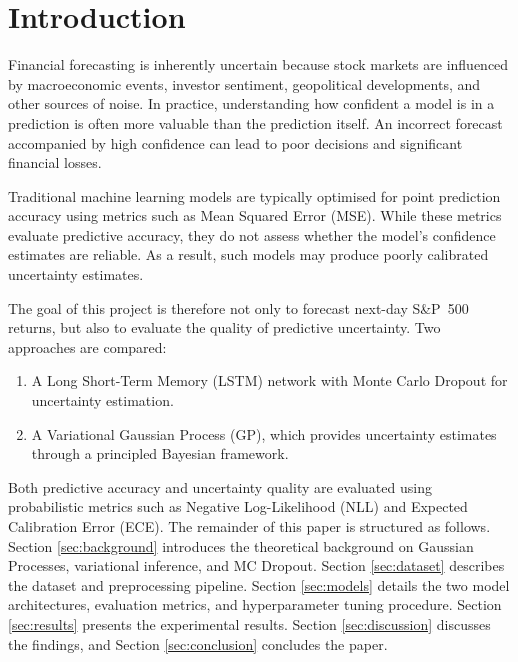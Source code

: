 \section{Introduction}

Financial forecasting is inherently uncertain because stock markets are influenced by macroeconomic events, investor sentiment, geopolitical developments, and other sources of noise. In practice, understanding how confident a model is in a prediction is often more valuable than the prediction itself. An incorrect forecast accompanied by high confidence can lead to poor decisions and significant financial losses.

Traditional machine learning models are typically optimised for point prediction accuracy using metrics such as Mean Squared Error (MSE). While these metrics evaluate predictive accuracy, they do not assess whether the model's confidence estimates are reliable. As a result, such models may produce poorly calibrated uncertainty estimates.

The goal of this project is therefore not only to forecast next-day S\&P~500 returns, but also to evaluate the quality of predictive uncertainty. Two approaches are compared:

\begin{enumerate}
    \item A Long Short-Term Memory (LSTM) network with Monte Carlo Dropout for uncertainty estimation.
    \item A Variational Gaussian Process (GP), which provides uncertainty estimates through a principled Bayesian framework.
\end{enumerate}

Both predictive accuracy and uncertainty quality are evaluated using probabilistic metrics such as Negative Log-Likelihood (NLL) and Expected Calibration Error (ECE). The remainder of this paper is structured as follows. Section \ref{sec:background} introduces the theoretical background on Gaussian Processes, variational inference, and MC Dropout. Section \ref{sec:dataset} describes the dataset and preprocessing pipeline. Section \ref{sec:models} details the two model architectures, evaluation metrics, and hyperparameter tuning procedure. Section \ref{sec:results} presents the experimental results. Section \ref{sec:discussion} discusses the findings, and Section \ref{sec:conclusion} concludes the paper.
